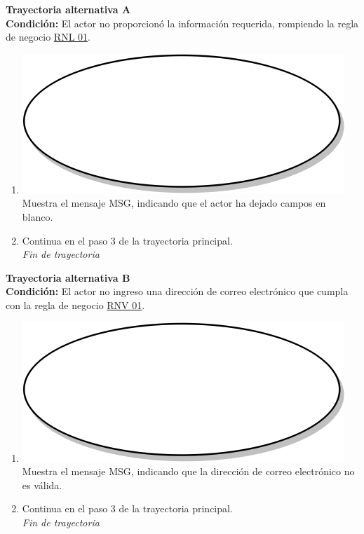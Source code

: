\textbf{Trayectoria alternativa A} \label{cu1_ta_a} \\
\textbf{Condición:} El actor no proporcionó la información requerida, rompiendo la regla de negocio \hyperref[rnl_01]{RNL 01}.\\
 \begin{enumerate}[label=A\arabic*]
    \item {\includegraphics[scale=.05]{Capitulo3/img/proceso.png} Muestra el mensaje MSG, indicando que el actor ha dejado campos en blanco.}
    \item {Continua en el paso 3 de la trayectoria principal.} \\
    \textit{Fin de trayectoria} \\
\end{enumerate}

\textbf{Trayectoria alternativa B} \label{cu1_1_ta_b}\\
\textbf{Condición:} El actor no ingreso una dirección de correo electrónico que cumpla con la regla de negocio \hyperref[rnv_01]{RNV 01}.\\
 \begin{enumerate}[label=B\arabic*]
    \item {\includegraphics[scale=.05]{Capitulo3/img/proceso.png} Muestra el mensaje MSG, indicando que la dirección de correo electrónico no es válida.}
    \item {Continua en el paso 3 de la trayectoria principal.} \\
    \textit{Fin de trayectoria} \\
\end{enumerate}

